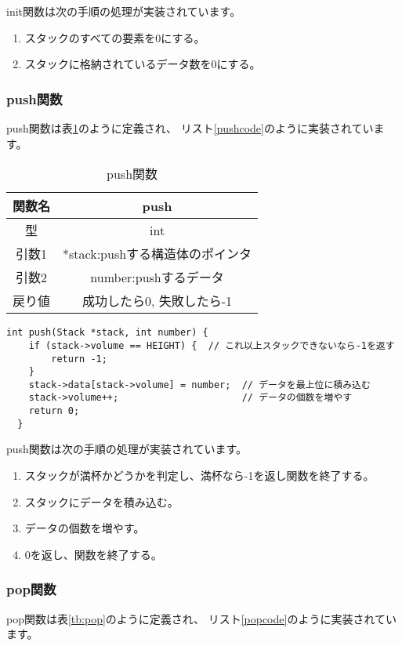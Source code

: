 \documentclass[a4j]{jarticle}
\begin{document}
init関数は次の手順の処理が実装されています。
\begin{enumerate}
  \item スタックのすべての要素を0にする。
  \item スタックに格納されているデータ数を0にする。
\end{enumerate}

\subsubsection{push関数}
\label{sec:push}
push関数は表\ref{tb:push}のように定義され、
リスト\ref{pushcode}のように実装されています。

\begin{table}[h]
  \centering
  \caption{push関数}
  \label{tb:push}
  \begin{tabular}{|c|c|}
    \hline
    関数名 & push                  \\
    \hline
    型   & int                   \\
    \hline
    引数1 & *stack:pushする構造体のポインタ \\
    \hline
    引数2 & number:pushするデータ      \\
    \hline
    戻り値 & 成功したら0, 失敗したら-1       \\
    \hline
  \end{tabular}
\end{table}

\begin{lstlisting}[caption=push関数,label=pushcode]
  int push(Stack *stack, int number) {
    if (stack->volume == HEIGHT) {  // これ以上スタックできないなら-1を返す
        return -1;
    }
    stack->data[stack->volume] = number;  // データを最上位に積み込む
    stack->volume++;                      // データの個数を増やす
    return 0;
  }
  \end{lstlisting}

push関数は次の手順の処理が実装されています。
\begin{enumerate}
  \item スタックが満杯かどうかを判定し、満杯なら-1を返し関数を終了する。
  \item スタックにデータを積み込む。
  \item データの個数を増やす。
  \item 0を返し、関数を終了する。
\end{enumerate}

\subsubsection{pop関数}
\label{sec:pop}
pop関数は表\ref{tb:pop}のように定義され、
リスト\ref{popcode}のように実装されています。
\end{document}
